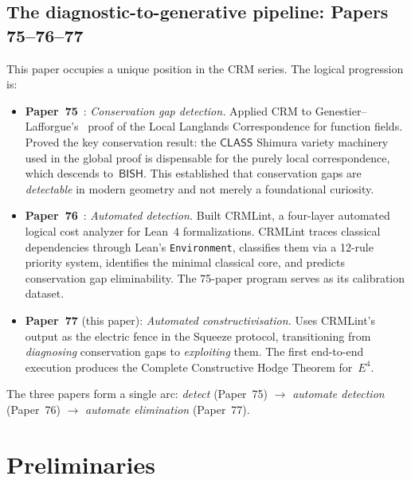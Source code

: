 \documentclass[11pt]{article}
\theoremstyle{plain}
\theoremstyle{definition}
\theoremstyle{remark}
\newcommand{\BISH}{\mathsf{BISH}}
\newcommand{\CLASS}{\mathsf{CLASS}}
\begin{document}
\subsection{The diagnostic-to-generative pipeline: Papers 75--76--77}

This paper occupies a unique position in the CRM series.  The
logical progression is:

\begin{itemize}[nosep]
\item \textbf{Paper~75}~\cite{Paper75}: \emph{Conservation gap
  detection.}  Applied CRM to Genestier--Lafforgue's~\cite{GenestierLafforgue2018}
  proof of the Local Langlands Correspondence for function fields.
  Proved the key conservation result: the $\CLASS$ Shimura
  variety machinery used in the global proof is dispensable for
  the purely local correspondence, which descends to~$\BISH$.
  This established that conservation gaps are \emph{detectable}
  in modern geometry and not merely a foundational curiosity.

\item \textbf{Paper~76}~\cite{Paper76}: \emph{Automated detection.}
  Built CRMLint, a four-layer automated logical cost analyzer
  for Lean~4 formalizations.  CRMLint traces classical dependencies
  through Lean's \texttt{Environment}, classifies them via a
  12-rule priority system, identifies the minimal classical core,
  and predicts conservation gap eliminability.  The 75-paper
  program serves as its calibration dataset.

\item \textbf{Paper~77} (this paper): \emph{Automated
  constructivisation.}  Uses CRMLint's output as the electric fence
  in the Squeeze protocol, transitioning from \emph{diagnosing}
  conservation gaps to \emph{exploiting} them.  The first
  end-to-end execution produces the Complete Constructive Hodge
  Theorem for~$E^4$.
\end{itemize}

\noindent
The three papers form a single arc: \emph{detect} (Paper~75)
$\to$ \emph{automate detection} (Paper~76) $\to$
\emph{automate elimination} (Paper~77).

\section{Preliminaries}\label{sec:prelim}
\end{document}
